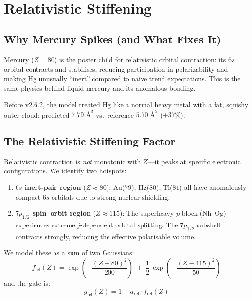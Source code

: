 \documentclass[11pt,letterpaper]{article}
\begin{document}
\section{Relativistic Stiffening}
\label{sec:rel}

\subsection{Why Mercury Spikes (and What Fixes It)}

Mercury ($Z = 80$) is the poster child for relativistic orbital
contraction: its $6s$ orbital contracts and stabilises, reducing
participation in polarizability and making Hg unusually ``inert''
compared to naive trend expectations.  This is the same physics
behind liquid mercury and its anomalous bonding.

Before v2.6.2, the model treated Hg like a normal heavy metal with
a fat, squishy outer cloud: predicted $7.79\;\text{\AA}^3$ vs.\ reference
$5.70\;\text{\AA}^3$ ($+37\%$).

\subsection{The Relativistic Stiffening Factor}

Relativistic contraction is \emph{not} monotonic with $Z$---it peaks
at specific electronic configurations.  We identify two hotspots:

\begin{enumerate}
\item \textbf{$6s$ inert-pair region} ($Z \approx 80$):
  Au($79$), Hg($80$), Tl($81$) all have anomalously compact $6s$
  orbitals due to strong nuclear shielding.

\item \textbf{$7p_{1/2}$ spin--orbit region} ($Z \approx 115$):
  The superheavy $p$-block (Nh--Og) experiences extreme $j$-dependent
  orbital splitting.  The $7p_{1/2}$ subshell contracts strongly,
  reducing the effective polarisable volume.
\end{enumerate}

We model these as a sum of two Gaussians:
\begin{equation}
f_{\text{rel}}(Z) = \exp\!\left(-\frac{(Z - 80)^2}{200}\right)
\;+\; \frac{1}{2}\,\exp\!\left(-\frac{(Z - 115)^2}{50}\right)
\label{eq:frel}
\end{equation}
and the gate is:
\begin{equation}
g_{\text{rel}}(Z) = 1 - a_{\text{rel}} \cdot f_{\text{rel}}(Z)
\label{eq:grel}
\end{equation}
\end{document}
